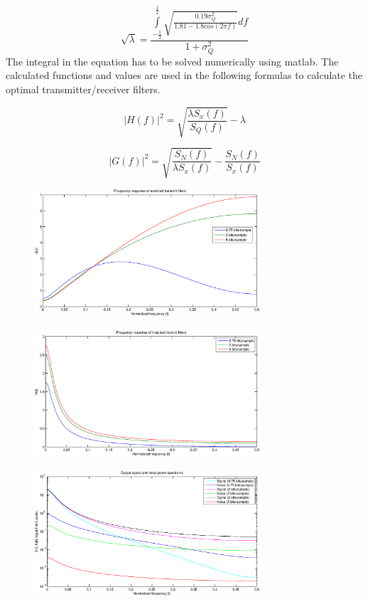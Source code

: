 	\begin{equation}
		\sqrt{\lambda}=\frac{\int\limits_{-\frac{1}{2}}^{\frac{1}{2}}\sqrt{\frac{0.19\sigma^2_Q}{1.81-1.8cos(2\pi f)}}df}{1+\sigma^2_Q}
	\end{equation}
	The integral in the equation has to be solved numerically using matlab. The calculated functions and values are used in the following formulas to calculate the optimal transmitter/receiver filters.
	
	\begin{equation}
		|H(f)|^2=\sqrt{\frac{\lambda S_x(f)}{S_Q(f)}}-\lambda
	\end{equation}
	
	\begin{equation}
		|G(f)|^2=\sqrt{\frac{S_N(f)}{\lambda S_x(f)}}-\frac{S_N(f)}{S_x(f)}
	\end{equation}
	
	
	
	\begin{figure}[H]
	  \centering
	  \includegraphics[width=0.75\textwidth]{img/Oppgave2a_freq_G}
	\end{figure}
	
	\begin{figure}[H]
	  \centering
	  \includegraphics[width=0.75\textwidth]{img/Oppgave2a_freq_H}
	\end{figure}
	
	\begin{figure}[H]
	  \centering
	  \includegraphics[width=0.75\textwidth]{img/Oppgave2a_sig_noise_freq_out}
	\end{figure}
	
